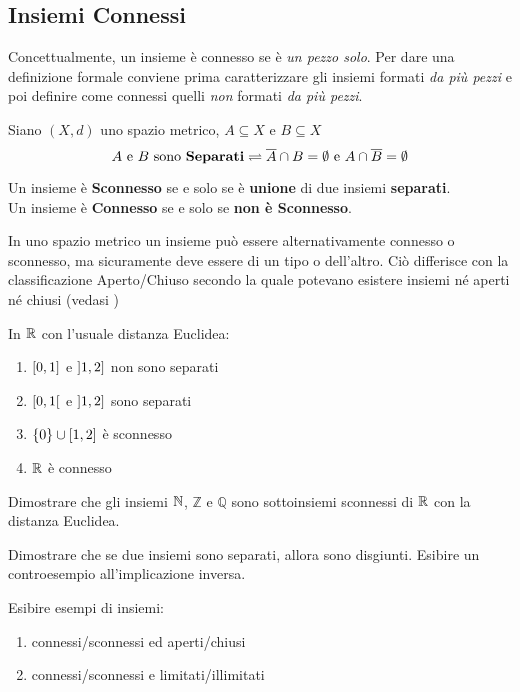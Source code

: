 \subsection{Insiemi Connessi}
Concettualmente, un insieme è connesso se è \textit{un pezzo solo}. Per dare una definizione formale conviene prima caratterizzare gli insiemi formati \textit{da più pezzi} e poi definire come connessi quelli \textit{non} formati \textit{da più pezzi}.
\begin{definition}
	Siano $(X,d)$ uno spazio metrico, $A \subseteq X$ e $B \subseteq X$
	\[A \text{ e } B \text{ sono \textbf{Separati}} \rightleftharpoons \overline{A} \cap B = \emptyset \text{ e } A \cap \overline{B} = \emptyset\]
\end{definition}
\begin{definition}
	\label{def:connesso}
	Un insieme è \textbf{Sconnesso} se e solo se è \textbf{unione} di due insiemi \textbf{separati}.\\
	Un insieme è \textbf{Connesso} se e solo se \textbf{non è Sconnesso}.
	\begin{note}
		In uno spazio metrico un insieme può essere alternativamente connesso o sconnesso, ma sicuramente deve essere di un tipo o dell'altro. Ciò differisce con la classificazione Aperto/Chiuso secondo la quale potevano esistere insiemi né aperti né chiusi (vedasi )
	\end{note}
\end{definition}
\begin{example}
	In $\mathbb{R}$ con l'usuale distanza Euclidea:
	\begin{enumerate}
		\item $\left[0,1\right]$ e $\left]1,2\right]$ non sono separati
		\item $\left[0,1\right[$ e $\left]1,2\right]$ sono separati
		\item $\left\{0\right\} \cup \left[1,2\right]$ è sconnesso
		\item $\mathbb{R}$ è connesso
	\end{enumerate}
\end{example}
\begin{exercise}
	Dimostrare che gli insiemi $\mathbb{N}$, $\mathbb{Z}$ e $\mathbb{Q}$ sono sottoinsiemi sconnessi di $\mathbb{R}$ con la distanza Euclidea.
\end{exercise}
\begin{exercise}
	Dimostrare che se due insiemi sono separati, allora sono disgiunti. Esibire un controesempio all'implicazione inversa.
\end{exercise}
\begin{exercise}
	Esibire esempi di insiemi:
	\begin{enumerate}
		\item connessi/sconnessi ed aperti/chiusi
		\item connessi/sconnessi e limitati/illimitati
	\end{enumerate}
\end{exercise}

